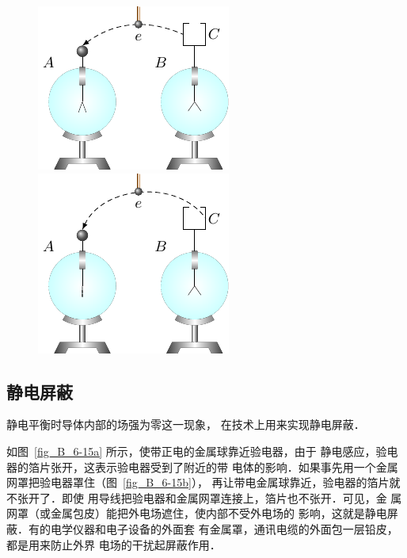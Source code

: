 \begin{figure}[htbp]
    \centering
    \begin{minipage}[t]{0.48\textwidth}
    \centering
    \includegraphics{fig/B/6-13.pdf}
    \caption{}\label{fig_B_6-13}
    \end{minipage}
    \begin{minipage}[t]{0.48\textwidth}
    \centering
    \includegraphics{fig/B/6-14.pdf}
    \caption{}\label{fig_B_6-14}
    \end{minipage}
\end{figure}

\subsection{静电屏蔽}

静电平衡时导体内部的场强为零这一现象，
在技术上用来实现静电屏蔽．


如图~\ref{fig_B_6-15a} 所示，使带正电的金属球靠近验电器，由于
静电感应，验电器的箔片张开，这表示验电器受到了附近的带
电体的影响．如果事先用一个金属网罩把验电器罩住（图~\ref{fig_B_6-15b}），
再让带电金属球靠近，验电器的箔片就不张开了．即使
用导线把验电器和金属网罩连接上，箔片也不张开．可见，金
属网罩（或金属包皮）能把外电场遮住，使内部不受外电场的
影响，这就是静电屏蔽．有的电学仪器和电子设备的外面套
有金属罩，通讯电缆的外面包一层铅皮，都是用来防止外界
电场的干扰起屏蔽作用．

